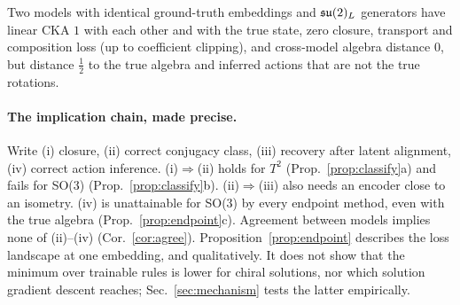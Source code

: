 \begin{corollary}\label{cor:agree}
Two models with identical ground-truth embeddings and $\mathfrak{su}(2)_L$ generators have linear CKA $1$ with each other and
with the true state, zero closure, transport and composition loss (up to coefficient clipping), and cross-model
algebra distance $0$, but distance $\frac12$ to the true algebra and inferred actions that are not the true rotations.
\end{corollary}

\paragraph{The implication chain, made precise.}
Write (i) closure, (ii) correct conjugacy class, (iii) recovery after latent alignment, (iv) correct action
inference. (i)$\Rightarrow$(ii) holds for $T^2$ (Prop.~\ref{prop:classify}a) and fails for SO(3)
(Prop.~\ref{prop:classify}b). (ii)$\Rightarrow$(iii) also needs an encoder close to an isometry. (iv) is unattainable
for SO(3) by every endpoint method, even with the true algebra (Prop.~\ref{prop:endpoint}c). Agreement between models
implies none of (ii)--(iv) (Cor.~\ref{cor:agree}).
Proposition~\ref{prop:endpoint} describes the loss landscape at one embedding, and qualitatively. It does not show
that the minimum over trainable rules is lower for chiral solutions, nor which solution gradient descent reaches;
Sec.~\ref{sec:mechanism} tests the latter empirically.
